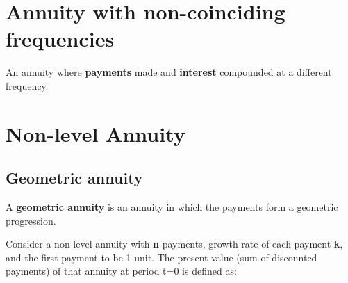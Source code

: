 

\section{Annuity with non-coinciding frequencies}
\begin{definition}
    An annuity where \textbf{payments} made and \textbf{interest} compounded at a different frequency. 
\end{definition}




























\section{Non-level Annuity}
\subsection{Geometric annuity}
\begin{definition}
    A \textbf{geometric annuity} is an annuity in which the payments form a geometric progression. 
\end{definition}
\begin{comments}

    Consider a non-level annuity with \textbf{n} payments, growth rate of each payment \textbf{k}, and the first payment to be 1 unit. 
    The present value (sum of discounted payments) of that annuity at period t=0 is defined as: 
\end{comments}

